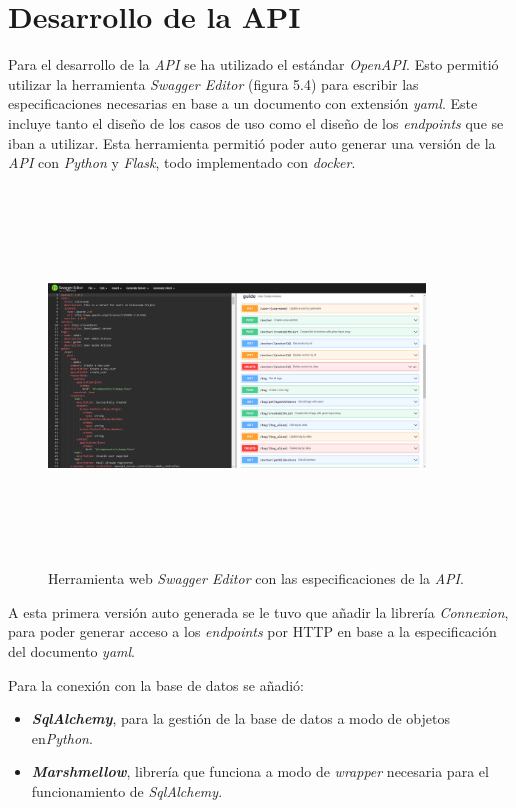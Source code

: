 \section{Desarrollo de la API}
Para el desarrollo de la \textit{API} se ha utilizado el estándar \textit{OpenAPI}. Esto permitió utilizar la herramienta \textit{Swagger Editor} (figura 5.4) para escribir las especificaciones necesarias en base a un documento con extensión \textit{yaml}. Este incluye tanto el diseño de los casos de uso como el diseño de los \textit{endpoints} que se iban a utilizar. Esta herramienta permitió poder auto generar una versión de la \textit{API} con \textit{Python} y \textit{Flask}, todo implementado con \textit{docker}.

\begin{figure}[t]
    \centering
    \includegraphics[width=10cm,height=10cm,keepaspectratio]{img/SwaggerEditor.png}
    \caption{Herramienta web \textit{Swagger Editor} con las especificaciones de la \textit{API}.}
    \label{fig:Swagger Editor}
\end{figure}
A esta primera versión auto generada se le tuvo que añadir la librería \textit{Connexion}, para poder generar acceso a los \textit{endpoints} por HTTP en base a la especificación del documento \textit{yaml}.

Para la conexión con la base de datos se añadió:
\begin{itemize}
    \item \textit{\textbf{SqlAlchemy}}, para la gestión de la base de datos a modo de objetos en\textit{Python}.
    \item \textit{\textbf{Marshmellow}}, librería que funciona a modo de \textit{wrapper} necesaria para el funcionamiento de \textit{SqlAlchemy}.
\end{itemize}

